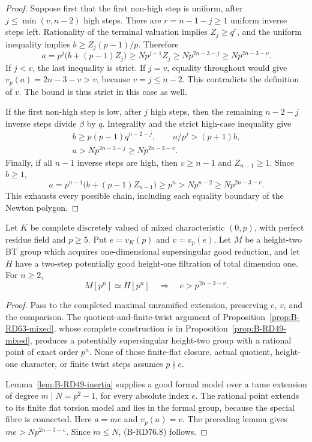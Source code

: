 \begin{proof}
Suppose first that the first non-high step is uniform, after
\(j\le\min(v,n-2)\) high steps. There are
\(r=n-1-j\ge1\) uniform inverse steps left. Rationality of
the terminal valuation implies \(Z_j\ge q^r\), and the
uniform inequality implies \(b\ge Z_j(p-1)/p\). Therefore
\[
 a=p^j\bigl(b+(p-1)Z_j\bigr)
    \ge Np^{j-1}Z_j
    \ge Np^{2n-3-j}
    \ge Np^{2n-3-v}.                              \tag{B-RD76.5}
\]
If \(j<v\), the last inequality is strict. If \(j=v\),
equality throughout would give
\(v_p(a)=2n-3-v>v\), because \(v=j\le n-2\).
This contradicts the definition of \(v\). The bound is thus
strict in this case as well.

If the first non-high step is low, after \(j\) high steps,
then the remaining \(n-2-j\) inverse steps divide \(\beta\)
by \(q\). Integrality and the strict high-case inequality give
\[
 \begin{gathered}
 b\ge p(p-1)q^{n-2-j},\qquad
 a/p^j>(p+1)b,\\
 a>Np^{2n-3-j}\ge Np^{2n-3-v}.
 \end{gathered}                                    \tag{B-RD76.6}
\]
Finally, if all \(n-1\) inverse steps are high, then
\(v\ge n-1\) and \(Z_{n-1}\ge1\). Since \(b\ge1\),
\[
 a=p^{n-1}\bigl(b+(p-1)Z_{n-1}\bigr)
       \ge p^n>Np^{n-2}\ge Np^{2n-3-v}.
                                                     \tag{B-RD76.7}
\]
This exhausts every possible chain, including each equality
boundary of the Newton polygon.
\end{proof}

\begin{proposition}
\label{prop:B-RD76-mixed}
Let \(K\) be complete discretely valued of mixed characteristic
\((0,p)\), with perfect residue field and \(p\ge5\). Put
\(e=v_K(p)\) and \(v=v_p(e)\). Let \(M\) be a height-two
BT group which acquires one-dimensional supersingular good
reduction, and let \(H\) have a two-step potentially good
height-one filtration of total dimension one. For \(n\ge2\),
\[
 M[p^n]\simeq H[p^n]\quad\Longrightarrow\quad
                     e>p^{2n-3-v}.                 \tag{B-RD76.8}
\]
\end{proposition}
\begin{proof}
Pass to the completed maximal unramified extension, preserving
\(e\), \(v\), and the comparison. The quotient-and-finite-twist
argument of Proposition~\ref{prop:B-RD63-mixed}, whose complete
construction is in Proposition~\ref{prop:B-RD49-mixed}, produces
a potentially supersingular height-two group with a rational
point of exact order \(p^n\). None of those finite-flat closure,
actual quotient, height-one character, or finite twist steps
assumes \(p\nmid e\).

Lemma~\ref{lem:B-RD49-inertia} supplies a good formal model
over a tame extension of degree \(m\mid N=p^2-1\), for every
absolute index \(e\). The rational point extends to its finite
flat torsion model and lies in the formal group, because the
special fibre is connected. Here \(a=me\) and \(v_p(a)=v\).
The preceding lemma gives \(me>Np^{2n-3-v}\). Since
\(m\le N\), (B-RD76.8) follows.
\end{proof}

